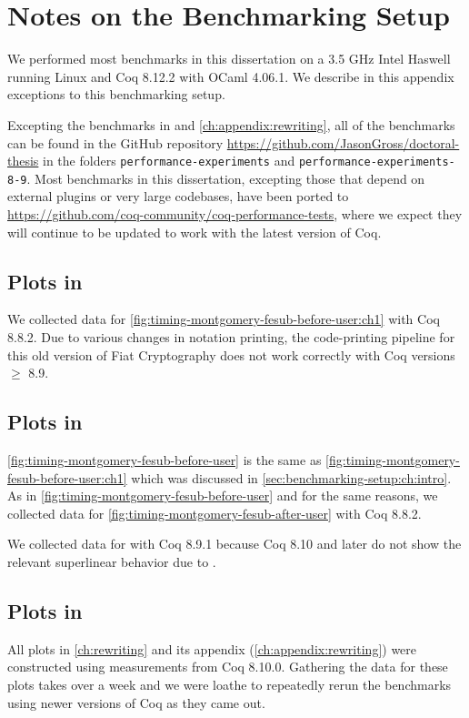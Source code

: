 \chapter{Notes on the Benchmarking Setup}\label{ch:appendix:benchmarking-setup}

We performed most benchmarks in this dissertation on a 3.5 GHz Intel Haswell running Linux and Coq 8.12.2 with OCaml 4.06.1.
We describe in this appendix exceptions to this benchmarking setup.

Excepting the benchmarks in  and \autoref{ch:appendix:rewriting}, all of the benchmarks can be found in the GitHub repository \url{https://github.com/JasonGross/doctoral-thesis} in the folders \texttt{performance-experiments} and \texttt{performance-experiments-8-9}.
Most benchmarks in this dissertation, excepting those that depend on external plugins or very large codebases, have been ported to \url{https://github.com/coq-community/coq-performance-tests}, where we expect they will continue to be updated to work with the latest version of Coq.

\section{Plots in }\label{sec:benchmarking-setup:ch:intro}
We collected data for \autoref{fig:timing-montgomery-fesub-before-user:ch1} with Coq 8.8.2.
Due to various changes in notation printing, the code-printing pipeline for this old version of Fiat Cryptography does not work correctly with Coq versions $\ge$ 8.9.

\section{Plots in }
\autoref{fig:timing-montgomery-fesub-before-user} is the same as \autoref{fig:timing-montgomery-fesub-before-user:ch1} which was discussed in \autoref{sec:benchmarking-setup:ch:intro}.
As in \autoref{fig:timing-montgomery-fesub-before-user} and for the same reasons, we collected data for \autoref{fig:timing-montgomery-fesub-after-user} with Coq 8.8.2.

We collected data for  with Coq 8.9.1 because Coq 8.10 and later do not show the relevant superlinear behavior due to .

\section{Plots in }
All plots in \autoref{ch:rewriting} and its appendix (\autoref{ch:appendix:rewriting}) were constructed using measurements from Coq 8.10.0.
Gathering the data for these plots takes over a week and we were loathe to repeatedly rerun the benchmarks using newer versions of Coq as they came out.
